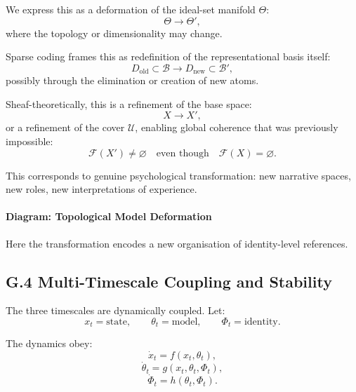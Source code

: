 \documentclass[11pt,a4paper,twoside]{article}
\begin{document}
We express this as a deformation of the ideal-set manifold $\Theta$:
\[
\Theta \longrightarrow \Theta',
\]
where the topology or dimensionality may change.

Sparse coding frames this as redefinition of the representational basis itself:
\[
D_{\text{old}} \subset \mathcal{B} \longrightarrow D_{\text{new}} \subset \mathcal{B}',
\]
possibly through the elimination or creation of new atoms.

Sheaf-theoretically, this is a refinement of the base space:
\[
X \longrightarrow X',
\]
or a refinement of the cover $\mathcal{U}$, enabling global coherence that was previously impossible:
\[
\mathscr{F}(X') \neq \varnothing \quad \text{even though} \quad \mathscr{F}(X) = \varnothing.
\]

This corresponds to genuine psychological transformation: new narrative spaces, new roles, new interpretations of experience.

\paragraph{Diagram: Topological Model Deformation}

\begin{center}
\end{center}

Here the transformation encodes a new organisation of identity-level references.

\subsection*{G.4 Multi-Timescale Coupling and Stability}

The three timescales are dynamically coupled. Let:
\[
x_t = \text{state}, \qquad \theta_t = \text{model}, \qquad \Phi_t = \text{identity}.
\]

The dynamics obey:
\[
\dot{x}_t = f(x_t, \theta_t),
\]
\[
\dot{\theta}_t = g(x_t, \theta_t, \Phi_t),
\]
\[
\dot{\Phi}_t = h(\theta_t, \Phi_t).
\]
\end{document}
